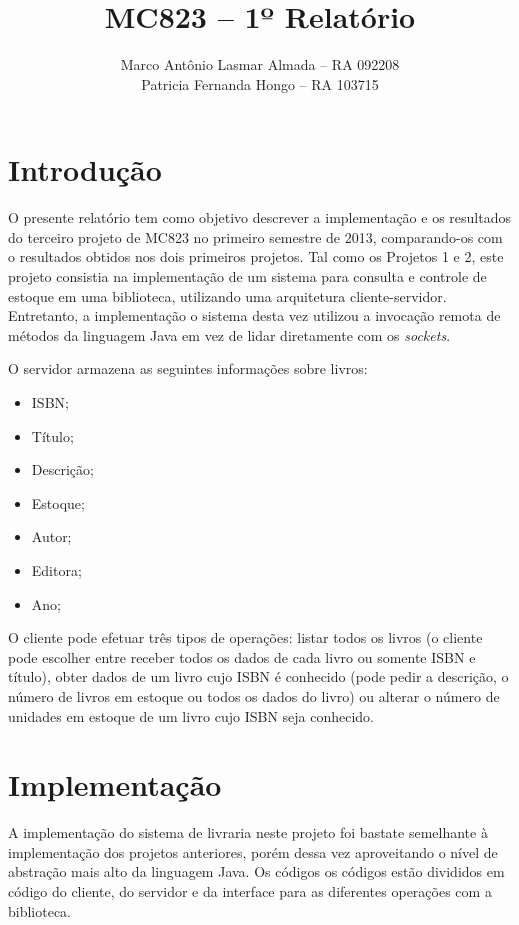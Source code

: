 \documentclass[11pt, brazil]{article} %
\title{MC823 -- 1º Relatório}
\author{Marco Antônio Lasmar Almada -- RA 092208 \\ Patricia Fernanda Hongo -- RA 103715}
\date{} %
\begin{document}
\maketitle

\section{Introdução}

O presente relatório tem como objetivo descrever a implementação e os resultados do terceiro projeto de MC823 no primeiro semestre de 2013, comparando-os com o resultados obtidos nos dois primeiros projetos. Tal como os Projetos 1 e 2, este projeto consistia na implementação de um sistema para consulta e controle de estoque em uma biblioteca, utilizando uma arquitetura cliente-servidor. Entretanto, a implementação o sistema desta vez utilizou a invocação remota de métodos da linguagem Java em vez de lidar diretamente com os \emph{sockets}.

O servidor armazena as seguintes informações sobre livros:
\begin{itemize}
  \item ISBN;
  \item Título;
  \item Descrição;
  \item Estoque;
  \item Autor;
  \item Editora;
  \item Ano;  
\end{itemize}

O cliente pode efetuar três tipos de operações: listar todos os livros (o cliente pode escolher entre receber todos os dados de cada livro ou somente ISBN e título), obter dados de um livro cujo ISBN é conhecido (pode pedir a descrição, o número de livros em estoque ou todos os dados do livro) ou alterar o número de unidades em estoque de um livro cujo ISBN seja conhecido.

\section{Implementação}


A implementação do sistema de livraria neste projeto foi bastate semelhante à implementação dos projetos anteriores, porém dessa vez aproveitando o nível de abstração mais alto da linguagem Java. Os códigos os códigos estão divididos em código do cliente, do servidor e da interface para as diferentes operações com a biblioteca.
\end{document}
